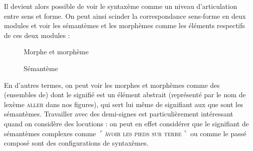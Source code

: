 Il devient alors possible de voir le syntaxème comme un niveau d’articulation entre sens et forme. On peut ainsi scinder la correspondance sens-forme en deux modules et voir les sémantèmes et les morphèmes comme les éléments respectifs de ces deux modules :

\begin{figure}
\caption{Morphe et morphème\label{fig:}}
\end{figure}

\begin{figure}
\caption{Sémantème}    
\end{figure}

En d’autres termes, on peut voir les morphes et morphèmes comme des (ensembles de)  dont le signifié est un élément abstrait (représenté par le nom de lexème \textsc{aller} dans nos figures), qui sert lui même de signifiant aux  que sont les sémantèmes. Travailler avec des demi-signes est particulièrement intéressant quand on considère des locutions : on peut en effet considérer que le signifiant de sémantèmes complexes comme $⌜$\textsc{àvoir} \textsc{les} \textsc{pieds} \textsc{sur} \textsc{terre}$⌝$ ou comme le passé composé sont des configurations de syntaxèmes.

